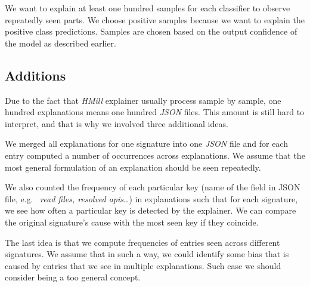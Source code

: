 We want to explain at least one hundred samples for each classifier to observe repeatedly seen parts. We choose positive samples because we want to explain the positive class predictions. Samples are chosen based on the output confidence of the model as described earlier.

\subsection{Additions}
Due to the fact that \emph{HMill} explainer usually process sample by sample, one hundred explanations means one hundred \emph{JSON} files. This amount is still hard to interpret, and that is why we involved three additional ideas.

We merged all explanations for one signature into one \emph{JSON} file and for each entry computed a number of occurrences across explanations. We assume that the most general formulation of an explanation should be seen repeatedly. 

We also counted the frequency of each particular key (name of the field in JSON file, e.g. \ \emph{read files, resolved apis}\dots) in explanations such that for each signature, we see how often a particular key is detected by the explainer. We can compare the original signature's cause with the most seen key if they coincide.

The last idea is that we compute frequencies of entries seen across different signatures. We assume that in such a way, we could identify some bias that is caused by entries that we see in multiple explanations. Such case we should consider being a too general concept.







